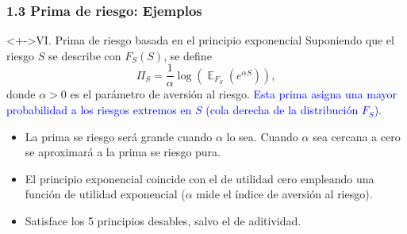 \documentclass[cjk,t,compress]{beamer}
\newcommand{\field}[1]{\mathbb{#1}}
\newcommand{\expec}{\operatorname{\field{E}}}
\renewcommand{\log}{\operatorname{\text{log}}}
\begin{document}
\begin{frame}[fragile]
	\frametitle{1.3 Prima de riesgo: Ejemplos}
	\scriptsize  	
	
	\vspace{0.2cm}
	\begin{block}<+->{VI. Prima de riesgo basada en el principio exponencial}
		\vspace{0.1cm}
		Suponiendo que el riesgo $S$ se describe con $F_{S}(S)$, se define
		\begin{equation}
		\Pi_{S} = \frac{1}{\alpha}\log\left(\expec _{F_{S}}(e^{\alpha S})\right),
		\end{equation}
		donde $\alpha > 0$ es el par\'ametro de aversi\'on al riesgo.
		\newline
		\textcolor{blue}{Esta prima asigna una mayor probabilidad a los riesgos extremos en $S$ (cola derecha de la distribuci\'on $F_{S}$).}
		
		\begin{itemize}
			\item La prima se riesgo ser\'a grande cuando $\alpha$ lo sea. Cuando $\alpha$ sea cercana a cero se aproximar\'a a la prima se riesgo pura.
			\item El principio exponencial coincide con el de utilidad cero empleando una funci\'on de utilidad exponencial ($\alpha$ mide el \'indice de aversi\'on al riesgo).
			\item Satisface los 5 principios desables, salvo el de aditividad.
		\end{itemize}
	\end{block}  		
	
\end{frame}
\end{document}
